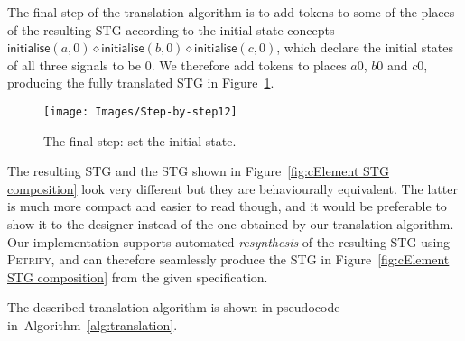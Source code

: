 \documentclass[british, journal]{IEEEtran}
\newcommand{\noun}[1]{\textsc{#1}}
\begin{document}
The final step of the translation algorithm is to add tokens to some of the places
of the resulting STG according to the initial state concepts
$\mathsf{initialise}(a,0) \diamond \mathsf{initialise}(b,0) \diamond \mathsf{initialise}(c,0)$, which declare the initial states of all three signals to be 0. We therefore
add tokens to places $a0$, $b0$ and $c0$, producing the fully translated STG in
Figure~\ref{fig:step-by-step12}.

\begin{figure}[h]
\begin{centering}
\texttt{[image: Images/Step-by-step12]}
\par
\protect\caption{\label{fig:step-by-step12}The final step: set the initial state.}
\par\end{centering}
\vspace{-3mm}
\end{figure}

The resulting STG and the STG shown in Figure~\ref{fig:cElement STG composition}
look very different but they are behaviourally equivalent. The latter is much more
compact and easier to read though, and it would be preferable to show it to the
designer instead of the one obtained by our translation algorithm. Our
implementation supports automated \emph{resynthesis} of the resulting STG
using \noun{Petrify}, and can therefore seamlessly produce the STG in
Figure~\ref{fig:cElement STG composition} from the given specification.




The described translation algorithm is shown in pseudocode
in~Algorithm~\ref{alg:translation}.
\end{document}
